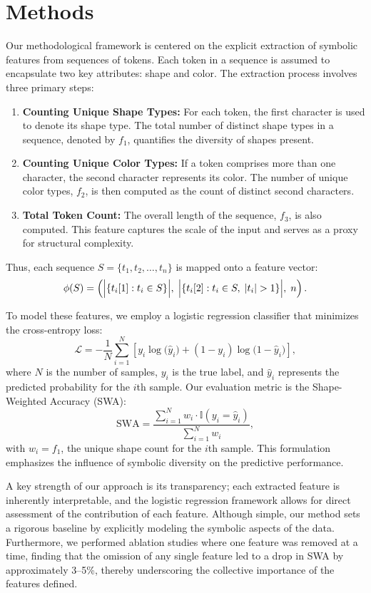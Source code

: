 \documentclass{article}
\begin{document}
\section{Methods}
Our methodological framework is centered on the explicit extraction of symbolic features from sequences of tokens. Each token in a sequence is assumed to encapsulate two key attributes: shape and color. The extraction process involves three primary steps:
\begin{enumerate}
    \item \textbf{Counting Unique Shape Types:} For each token, the first character is used to denote its shape type. The total number of distinct shape types in a sequence, denoted by \(f_1\), quantifies the diversity of shapes present.
    \item \textbf{Counting Unique Color Types:} If a token comprises more than one character, the second character represents its color. The number of unique color types, \(f_2\), is then computed as the count of distinct second characters.
    \item \textbf{Total Token Count:} The overall length of the sequence, \(f_3\), is also computed. This feature captures the scale of the input and serves as a proxy for structural complexity.
\end{enumerate}
Thus, each sequence \(S = \{t_1, t_2, \ldots, t_n\}\) is mapped onto a feature vector:
\[
\phi(S) = \left( \Bigl|\{t_i[1] : t_i \in S\}\Bigr|,\; \Bigl|\{t_i[2] : t_i \in S, \; |t_i| > 1\}\Bigr|,\; n \right).
\]

To model these features, we employ a logistic regression classifier that minimizes the cross-entropy loss:
\[
\mathcal{L} = -\frac{1}{N}\sum_{i=1}^{N} \left[ y_i \log\bigl(\hat{y}_i\bigr) + (1-y_i) \log\bigl(1-\hat{y}_i\bigr) \right],
\]
where \(N\) is the number of samples, \(y_i\) is the true label, and \(\hat{y}_i\) represents the predicted probability for the \(i\)th sample. Our evaluation metric is the Shape-Weighted Accuracy (SWA):
\[
\mathrm{SWA} = \frac{\sum_{i=1}^{N} w_i \cdot \mathbb{I}(y_i = \hat{y}_i)}{\sum_{i=1}^{N} w_i},
\]
with \(w_i = f_1\), the unique shape count for the \(i\)th sample. This formulation emphasizes the influence of symbolic diversity on the predictive performance.

A key strength of our approach is its transparency; each extracted feature is inherently interpretable, and the logistic regression framework allows for direct assessment of the contribution of each feature. Although simple, our method sets a rigorous baseline by explicitly modeling the symbolic aspects of the data. Furthermore, we performed ablation studies where one feature was removed at a time, finding that the omission of any single feature led to a drop in SWA by approximately 3–5\%, thereby underscoring the collective importance of the features defined.
\end{document}
